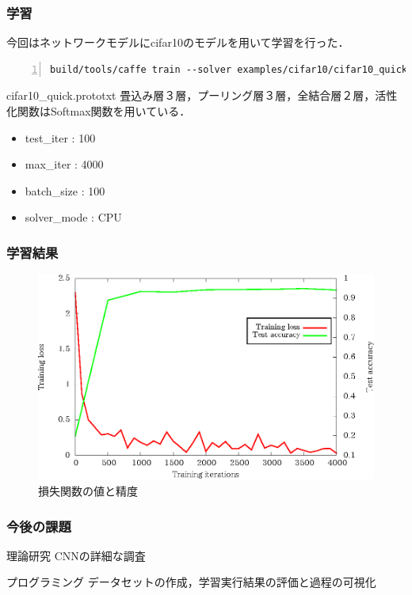 \documentclass[dvipdfmx,11pt,notheorems]{beamer}
\theoremstyle{definition}
\begin{document}
\begin{frame}[fragile]\frametitle{学習}
 今回はネットワークモデルにcifar10のモデルを用いて学習を行った．
\begin{lstlisting}[basicstyle=\ttfamily\footnotesize, frame=single, tabsize=2,showtabs,firstnumber=1, numbers=left, breaklines=true]
build/tools/caffe train --solver examples/cifar10/cifar10_quick_solver.prototxt
\end{lstlisting}
\begin{exampleblock}{cifar10\_quick.prototxt}
 畳込み層３層，プーリング層３層，全結合層２層，活性化関数はSoftmax関数を用いている．
\end{exampleblock}
\begin{itemize}
 \item test\_iter : 100
 \item max\_iter : 4000
 \item batch\_size : 100
 \item solver\_mode : CPU
\end{itemize}
\end{frame}

\begin{frame}[fragile]\frametitle{学習結果}
\begin{figure}[ht]
 \centering
 \includegraphics[scale=1.0]{fig/eps/result_train_test_graph.eps}
 \caption{損失関数の値と精度 }
\end{figure}
\end{frame}

\begin{frame}\frametitle{今後の課題}

\begin{block}{理論研究}
CNNの詳細な調査
\end{block}

\vspace{1cm}
\begin{exampleblock}{プログラミング}
データセットの作成，学習実行結果の評価と過程の可視化
\end{exampleblock}
\end{frame}
\end{document}
